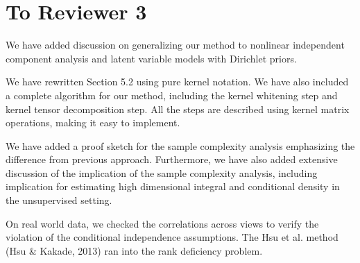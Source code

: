 \documentclass{article}
\begin{document}
\section*{To Reviewer 3}

We have added discussion on generalizing our method to nonlinear independent component analysis and latent variable models with Dirichlet priors.

We have rewritten Section 5.2 using pure kernel notation.
We have also included a complete algorithm for our method, including the kernel whitening step and kernel tensor decomposition step. All the steps are described using kernel matrix operations, making it easy to implement.

We have added a proof sketch for the sample complexity analysis emphasizing the difference from previous approach. Furthermore, we have also added extensive discussion of the implication of the sample complexity analysis, including implication for estimating high dimensional integral and conditional density in the unsupervised setting.

On real world data, we checked the correlations across views to verify the violation of the conditional independence assumptions. The Hsu et al. method (Hsu \& Kakade, 2013) ran into the rank deficiency problem.
\end{document}
